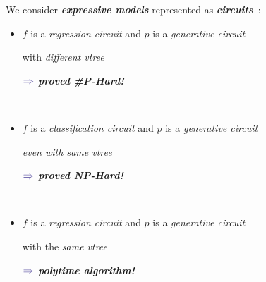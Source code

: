 \documentclass[final]{beamer}
\newcommand{\commenti}[3][\normalsize]{\hspace{50pt}\begin{minipage}{.9\linewidth}
          \raggedleft
          {
            $\color{violet}\boldsymbol\Rightarrow$
            #1
            {\emph{#2}}
          }
      \end{minipage}#3\\
}
\begin{document}
\begin{frame}{}
\begin{textblock}{39}
\begin{minipage}{0.94\linewidth}
\begin{itemize}
  \end{itemize}  
\end{minipage}
\vspace{20pt}

  We consider \emph{\textbf{expressive models}} represented as \emph{\textbf{circuits}}~\cite{Darwiche2003}:\\[10pt]
  \hfill\begin{minipage}{0.95\linewidth}
  \begin{itemize}
    \setlength{\itemsep}{10pt}
  \item $f$ is a \emph{{regression circuit}} and $p$ is a \emph{{generative
        circuit}}\par with {\emph{different vtree}}\\[-60pt]
    \commenti{{\color{untractable_red}\textbf{proved \#P-Hard! {\large\frownie{}}}}}{}
  \item $f$ is a \emph{{classification circuit}} and $p$ is a \emph{{generative
        circuit}}\par {\emph{even with same vtree}}\\[-50pt]
    \commenti{{\color{untractable_red}\textbf{proved NP-Hard! {\large\frownie{}}}}  {}}{}
  \item  $f$ is a \emph{{regression circuit}} and $p$ is a \emph{{generative
        circuit}}\par with the {\emph{same vtree}}\\[-60pt]
    \commenti{ {\color{tractable_green} \textbf{polytime algorithm! {\large\smiley{}}}}}{}
  \end{itemize}  
  \end{minipage}


\end{textblock}
\end{frame}
\end{document}
